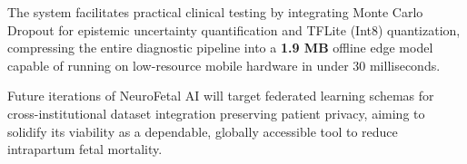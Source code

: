 The system facilitates practical clinical testing by integrating Monte Carlo Dropout for epistemic uncertainty quantification and TFLite (Int8) quantization, compressing the entire diagnostic pipeline into a \textbf{1.9 MB} offline edge model capable of running on low-resource mobile hardware in under 30 milliseconds.

Future iterations of NeuroFetal AI will target federated learning schemas for cross-institutional dataset integration preserving patient privacy, aiming to solidify its viability as a dependable, globally accessible tool to reduce intrapartum fetal mortality.




